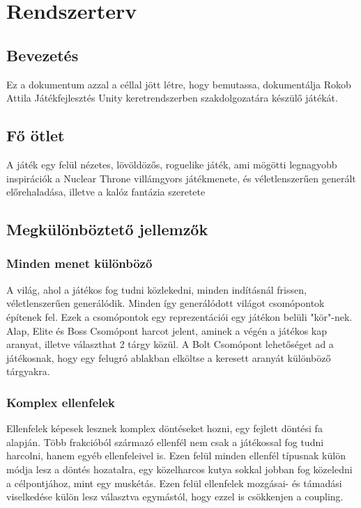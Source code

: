 \documentclass[
]{thesis-ekf}
\theoremstyle{definition}
\theoremstyle{remark}
\begin{document}
	\chapter{Rendszerterv}
	\section{Bevezetés}
	Ez a dokumentum azzal a céllal jött létre, hogy bemutassa, dokumentálja Rokob Attila Játékfejlesztés Unity keretrendszerben szakdolgozatára készülő játékát.
	
	\section{Fő ötlet}
	A játék egy felül nézetes, lövöldözős, roguelike \cite{roguelike} játék, ami mögötti legnagyobb inspirációk a Nuclear Throne \cite{nuclearThrone} villámgyors játékmenete, és véletlenszerűen generált előrehaladása, illetve a kalóz fantázia szeretete
	
	\section{Megkülönböztető jellemzők}
	\subsection{Minden menet különböző}
	A világ, ahol a játékos fog tudni közlekedni, minden indításnál frissen, véletlenszerűen generálódik. Minden így generálódott világot csomópontok építenek fel. Ezek a csomópontok egy reprezentációi egy játékon belüli "kör"-nek. Alap, Elite és Boss Csomópont harcot jelent, aminek a végén a játékos kap aranyat, illetve választhat 2 tárgy közül. A Bolt Csomópont lehetőséget ad a játékosnak, hogy egy felugró ablakban elköltse a keresett aranyát különböző tárgyakra.
	
	\subsection{Komplex ellenfelek}
	Ellenfelek képesek lesznek komplex döntéseket hozni, egy fejlett döntési fa alapján. Több frakcióból származó ellenfél nem csak a játékossal fog tudni harcolni, hanem egyéb ellenfeleivel is. Ezen felül minden ellenfél típusnak külön módja lesz a döntés hozatalra, egy közelharcos kutya sokkal jobban fog közeledni a célpontjához, mint egy muskétás. Ezen felül ellenfelek mozgásai- és támadási viselkedése külön lesz választva egymástól, hogy ezzel is csökkenjen a coupling.
	
\end{document}
